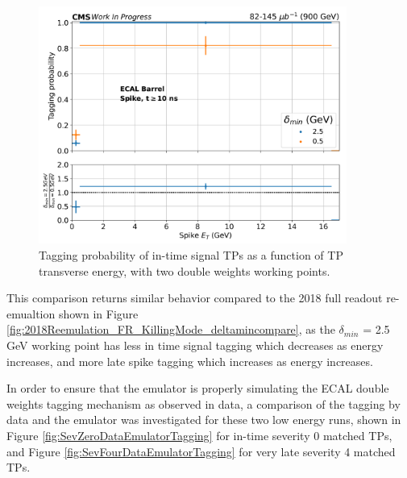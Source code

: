 \begin{figure}[H]
    \centering
    \includegraphics[width=0.9\textwidth]{Images/ECAL/DW/Sev_four_VeryLate_Average_EnergyVsTimeOccupancy_linear.png}
    \caption{Tagging probability of in-time signal TPs as a function of TP transverse energy, with two double weights working points.}
    \label{fig:2021_2022_900GeVCollisions_VeryLateSpikeTagging}
\end{figure}

This comparison returns similar behavior compared to the 2018 full readout re-emualtion shown in Figure \ref{fig:2018Reemulation_FR_KillingMode_deltamincompare}, as the $\delta_{min}$ = 2.5 GeV working point has less in time signal tagging which decreases as energy increases, and more late spike tagging which increases as energy increases.

In order to ensure that the emulator is properly simulating the ECAL double weights tagging mechanism as observed in data, a comparison of the tagging by data and the emulator was investigated for these two low energy runs, shown in Figure \ref{fig:SevZeroDataEmulatorTagging} for in-time severity 0 matched TPs, and Figure \ref{fig:SevFourDataEmulatorTagging} for very late severity 4 matched TPs.

